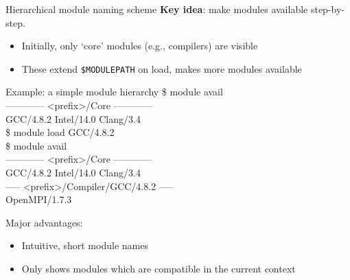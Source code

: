\documentclass[10pt,xcolor={usenames,dvipsnames}]{beamer}
\begin{document}
\begin{frame}{Hierarchical module naming scheme}
    \textbf{Key idea}: make modules available step-by-step.
    \begin{itemize}
        \item
            Initially, only `core' modules (e.g., compilers) are visible
        \item
            These extend \texttt{\$MODULEPATH} on load, makes
            more modules available
    \end{itemize}
    \quad\quad
    \begin{minipage}{0.9\textwidth}
        \begin{exampleblock}{\footnotesize Example: a simple module hierarchy}
            \scriptsize
            \ttfamily
            \$ module avail\\
            ------------ <prefix>/Core ------------\\
            GCC/4.8.2 \quad Intel/14.0 \quad Clang/3.4\\
            \$ module load GCC/4.8.2\\
            \$ module avail\\
            ------------ <prefix>/Core ------------\\
            GCC/4.8.2 \quad Intel/14.0 \quad Clang/3.4\\
            ----- <prefix>/Compiler/GCC/4.8.2 -----\\
            OpenMPI/1.7.3
        \end{exampleblock}
    \end{minipage}

    \medskip
    Major advantages:
    \begin{itemize}
        \item
            Intuitive, short module names
        \item
            Only shows modules which are compatible in the current context
    \end{itemize}
\end{frame}

\end{document}
